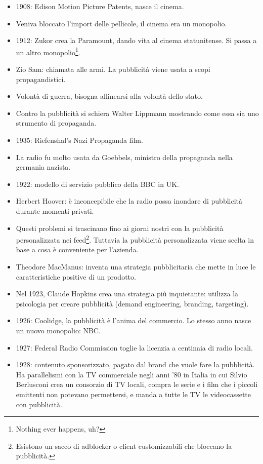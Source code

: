 \begin{itemize}
  \item 1908: Edison Motion Picture Patents, nasce il cinema. 
  \item Veniva bloccato l'import delle pellicole, il cinema era un monopolio. 
  \item 1912: Zukor crea la Paramount, dando vita al cinema statunitense. Si passa a un altro monopolio\footnote{Nothing ever happens, uh?}.
  \item Zio Sam: chiamata alle armi. La pubblicità viene usata a scopi propagandistici.
  \item Volontà di guerra, bisogna allinearsi alla volontà dello stato. 
  \item Contro la pubblicità si schiera Walter Lippmann mostrando come essa sia uno strumento di propaganda. 
  \item 1935: Riefenshal's Nazi Propaganda film. 
  \item La radio fu molto usata da Goebbels,  ministro della propaganda nella germania nazista.
  \item 1922: modello di servizio pubblico della BBC in UK. 
  \item Herbert Hoover: è inconcepibile che la radio possa inondare di pubblicità durante momenti privati.
  \item Questi problemi si trascinano fino ai giorni nostri con la pubblicità personalizzata nei feed\footnote{Esistono un sacco di adblocker o client customizzabili che bloccano la pubblicità.}. Tuttavia la pubblicità personalizzata viene scelta in base a cosa è conveniente per l'azienda.
  \item Theodore MacManus: inventa una strategia pubblicitaria che mette in luce le caratteristiche positive di un prodotto. 
  \item Nel 1923, Claude Hopkins crea una strategia più inquietante: utilizza la psicologia per creare pubblicità (demand engineering, branding, targeting).
  \item 1926: Coolidge, la pubblicità è l'anima del commercio. Lo stesso anno nasce un nuovo monopolio: NBC.
  \item 1927: Federal Radio Commission toglie la licenzia a centinaia di radio locali. 
  \item 1928: contenuto sponsorizzato, pagato dal brand che vuole fare la pubblicità. Ha parallelismi con la TV commerciale negli anni '80 in Italia in cui Silvio Berlusconi crea un consorzio di TV locali, compra le serie e i film che i piccoli emittenti non potevano permettersi, e manda a tutte le TV le videocassette con pubblicità.

\end{itemize}
